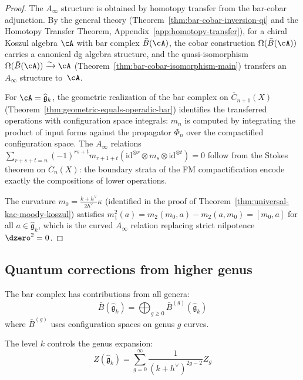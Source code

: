 \begin{proof}
The $A_\infty$ structure is obtained by homotopy transfer from the bar-cobar adjunction.  By the general theory (Theorem~\ref{thm:bar-cobar-inversion-qi} and the Homotopy Transfer Theorem, Appendix~\ref{app:homotopy-transfer}), for a chiral Koszul algebra $\cA$ with bar complex $\bar{B}(\cA)$, the cobar construction $\Omega(\bar{B}(\cA))$ carries a canonical dg algebra structure, and the quasi-isomorphism $\Omega(\bar{B}(\cA)) \xrightarrow{\sim} \cA$ (Theorem~\ref{thm:bar-cobar-isomorphism-main}) transfers an $A_\infty$ structure to~$\cA$.

For $\cA = \widehat{\mathfrak{g}}_k$, the geometric realization of the bar complex on $\overline{C}_{n+1}(X)$ (Theorem~\ref{thm:geometric-equals-operadic-bar}) identifies the transferred operations with configuration space integrals: $m_n$ is computed by integrating the product of input forms against the propagator $\Phi_n$ over the compactified configuration space.  The $A_\infty$ relations $\sum_{r+s+t=n}(-1)^{rs+t} m_{r+1+t}(\mathrm{id}^{\otimes r} \otimes m_s \otimes \mathrm{id}^{\otimes t}) = 0$ follow from the Stokes theorem on $\overline{C}_n(X)$: the boundary strata of the FM compactification encode exactly the compositions of lower operations.

The curvature $m_0 = \frac{k+h^\vee}{2h^\vee}\kappa$ (identified in the proof of Theorem~\ref{thm:universal-kac-moody-koszul}) satisfies $m_1^2(a) = m_2(m_0, a) - m_2(a, m_0) = [m_0, a]$ for all $a \in \widehat{\mathfrak{g}}_k$, which is the curved $A_\infty$ relation replacing strict nilpotence $\dzero^2 = 0$.
\end{proof}

\subsection{Quantum corrections from higher genus}

\begin{remark}
The bar complex has contributions from all genera:
\begin{equation}
\bar{B}(\widehat{\mathfrak{g}}_k) = \bigoplus_{g \geq 0} \bar{B}^{(g)}(\widehat{\mathfrak{g}}_k)
\end{equation}
where $\bar{B}^{(g)}$ uses configuration spaces on genus $g$ curves.

The level $k$ controls the genus expansion:
\begin{equation}
Z(\widehat{\mathfrak{g}}_k) = \sum_{g=0}^\infty \frac{1}{(k+h^\vee)^{2g-2}} Z_g
\end{equation}
\end{remark}

